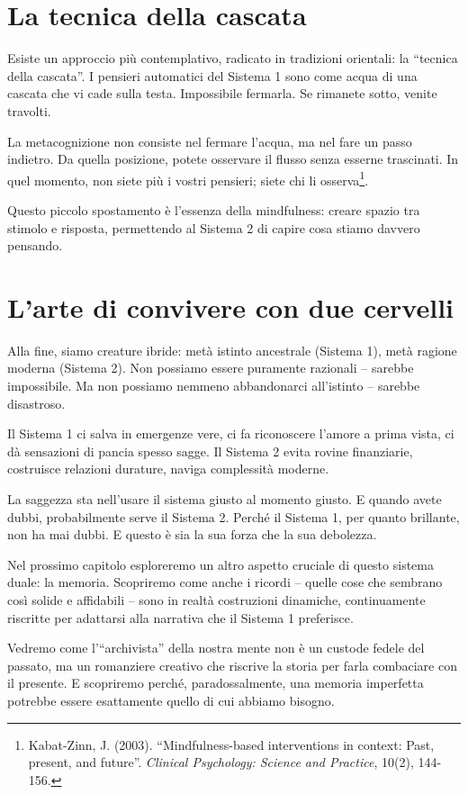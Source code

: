 \section{La tecnica della cascata}

Esiste un approccio più contemplativo, radicato in tradizioni orientali: la ``tecnica della cascata''. I pensieri automatici del Sistema 1 sono come acqua di una cascata che vi cade sulla testa. Impossibile fermarla. Se rimanete sotto, venite travolti.

La metacognizione non consiste nel fermare l'acqua, ma nel fare un passo indietro. Da quella posizione, potete osservare il flusso senza esserne trascinati. In quel momento, non siete più i vostri pensieri; siete chi li osserva\footnote{Kabat-Zinn, J. (2003). ``Mindfulness-based interventions in context: Past, present, and future''. \textit{Clinical Psychology: Science and Practice}, 10(2), 144-156.}.

Questo piccolo spostamento è l'essenza della mindfulness: creare spazio tra stimolo e risposta, permettendo al Sistema 2 di capire cosa stiamo davvero pensando.

\section{L'arte di convivere con due cervelli}

Alla fine, siamo creature ibride: metà istinto ancestrale (Sistema 1), metà ragione moderna (Sistema 2). Non possiamo essere puramente razionali -- sarebbe impossibile. Ma non possiamo nemmeno abbandonarci all'istinto -- sarebbe disastroso.

Il Sistema 1 ci salva in emergenze vere, ci fa riconoscere l'amore a prima vista, ci dà sensazioni di pancia spesso sagge. Il Sistema 2 evita rovine finanziarie, costruisce relazioni durature, naviga complessità moderne.

La saggezza sta nell'usare il sistema giusto al momento giusto. E quando avete dubbi, probabilmente serve il Sistema 2. Perché il Sistema 1, per quanto brillante, non ha mai dubbi. E questo è sia la sua forza che la sua debolezza.

\bigskip

Nel prossimo capitolo esploreremo un altro aspetto cruciale di questo sistema duale: la memoria. Scopriremo come anche i ricordi -- quelle cose che sembrano così solide e affidabili -- sono in realtà costruzioni dinamiche, continuamente riscritte per adattarsi alla narrativa che il Sistema 1 preferisce.

Vedremo come l'``archivista'' della nostra mente non è un custode fedele del passato, ma un romanziere creativo che riscrive la storia per farla combaciare con il presente. E scopriremo perché, paradossalmente, una memoria imperfetta potrebbe essere esattamente quello di cui abbiamo bisogno.